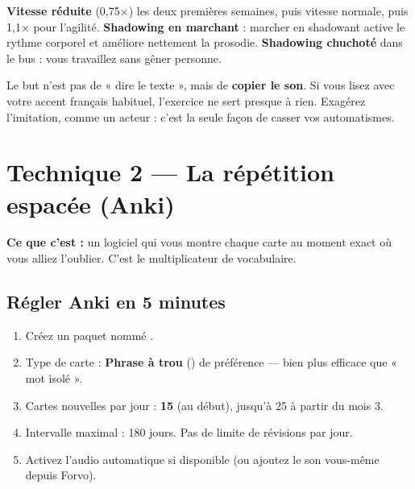 \begin{astuce}
\textbf{Vitesse réduite} (0,75×) les deux premières semaines, puis vitesse normale, puis
1,1× pour l'agilité. \textbf{Shadowing en marchant} : marcher en shadowant active le rythme
corporel et améliore nettement la prosodie. \textbf{Shadowing chuchoté} dans le bus : vous
travaillez sans gêner personne.
\end{astuce}

\begin{piege}
Le but n'est pas de « dire le texte », mais de \textbf{copier le son}. Si vous lisez avec
votre accent français habituel, l'exercice ne sert presque à rien. Exagérez l'imitation,
comme un acteur : c'est la seule façon de casser vos automatismes.
\end{piege}

\section{Technique 2 --- La répétition espacée (Anki)}
\textbf{Ce que c'est :} un logiciel qui vous montre chaque carte au moment exact où vous
alliez l'oublier. C'est le multiplicateur de vocabulaire.

\subsection{Régler Anki en 5 minutes}
\begin{enumerate}
  \item Créez un paquet nommé .
  \item Type de carte : \textbf{Phrase à trou} () de préférence --- bien plus
  efficace que « mot isolé ».
  \item Cartes nouvelles par jour : \textbf{15} (au début), jusqu'à 25 à partir du mois 3.
  \item Intervalle maximal : 180 jours. Pas de limite de révisions par jour.
  \item Activez l'audio automatique si disponible (ou ajoutez le son vous-même depuis Forvo).
\end{enumerate}

